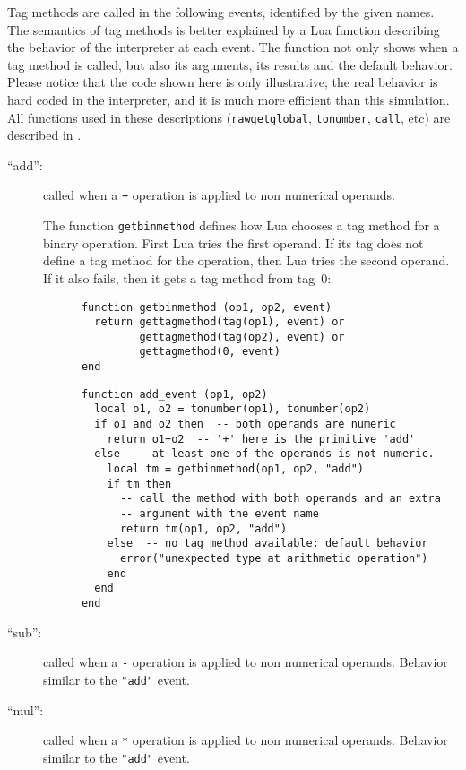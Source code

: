Tag methods are called in the following events,
identified by the given names.
The semantics of tag methods is better explained by a Lua function
describing the behavior of the interpreter at each event.
The function not only shows when a tag method is called,
but also its arguments, its results and the default behavior.
Please notice that the code shown here is only illustrative;
the real behavior is hard coded in the interpreter,
and it is much more efficient than this simulation.
All functions used in these descriptions
(\verb|rawgetglobal|, \verb|tonumber|, \verb|call|, etc)
are described in .

\begin{description}

\item[``add'':]
called when a \verb|+| operation is applied to non numerical operands.

The function \verb|getbinmethod| defines how Lua chooses a tag method
for a binary operation.
First Lua tries the first operand.
If its tag does not define a tag method for the operation,
then Lua tries the second operand.
If it also fails, then it gets a tag method from tag~0:
\begin{verbatim}
      function getbinmethod (op1, op2, event)
        return gettagmethod(tag(op1), event) or
               gettagmethod(tag(op2), event) or
               gettagmethod(0, event)
      end
\end{verbatim}
\begin{verbatim}
      function add_event (op1, op2)
        local o1, o2 = tonumber(op1), tonumber(op2)
        if o1 and o2 then  -- both operands are numeric
          return o1+o2  -- '+' here is the primitive 'add'
        else  -- at least one of the operands is not numeric.
          local tm = getbinmethod(op1, op2, "add")
          if tm then
            -- call the method with both operands and an extra
            -- argument with the event name
            return tm(op1, op2, "add")
          else  -- no tag method available: default behavior
            error("unexpected type at arithmetic operation")
          end
        end
      end
\end{verbatim}

\item[``sub'':]
called when a \verb|-| operation is applied to non numerical operands.
Behavior similar to the \verb|"add"| event.

\item[``mul'':]
called when a \verb|*| operation is applied to non numerical operands.
Behavior similar to the \verb|"add"| event.


\end{description}
